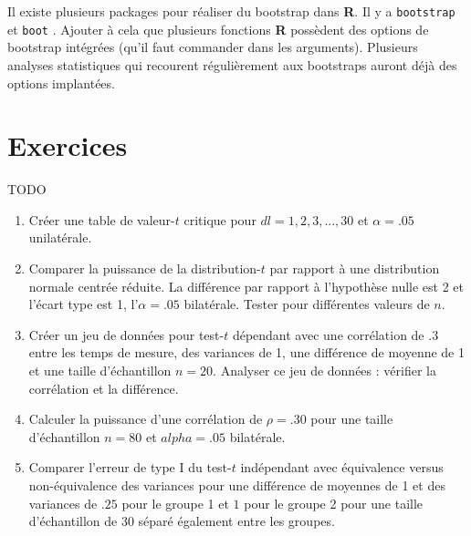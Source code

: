 \documentclass[
]{book}
\begin{document}
Il existe plusieurs packages pour réaliser du bootstrap dans \textbf{R}. Il y a \texttt{bootstrap} \autocite{bootstrap} et \texttt{boot} \autocite{Canty21}. Ajouter à cela que plusieurs fonctions \textbf{R} possèdent des options de bootstrap intégrées (qu'il faut commander dans les arguments). Plusieurs analyses statistiques qui recourent régulièrement aux bootstraps auront déjà des options implantées.

\hypertarget{exercice-analyse}{%
\chapter*{Exercices}\label{exercice-analyse}}

TODO

\begin{enumerate}
\def\labelenumi{\arabic{enumi}.}
\item
  Créer une table de valeur-\(t\) critique pour \(dl = 1,2,3 ,... ,30\) et \(\alpha=.05\) unilatérale.
\item
  Comparer la puissance de la distribution-\(t\) par rapport à une distribution normale centrée réduite. La différence par rapport à l'hypothèse nulle est 2 et l'écart type est 1, l'\(\alpha = .05\) bilatérale. Tester pour différentes valeurs de \(n\).
\item
  Créer un jeu de données pour test-\(t\) dépendant avec une corrélation de .3 entre les temps de mesure, des variances de 1, une différence de moyenne de 1 et une taille d'échantillon \(n = 20\). Analyser ce jeu de données : vérifier la corrélation et la différence.
\item
  Calculer la puissance d'une corrélation de \(\rho = .30\) pour une taille d'échantillon \(n=80\) et \(alpha = .05\) bilatérale.
\item
  Comparer l'erreur de type I du test-\(t\) indépendant avec équivalence versus non-équivalence des variances pour une différence de moyennes de 1 et des variances de \(.25\) pour le groupe 1 et \(1\) pour le groupe 2 pour une taille d'échantillon de 30 séparé également entre les groupes.
\end{enumerate}

\printbibliography
\end{document}
